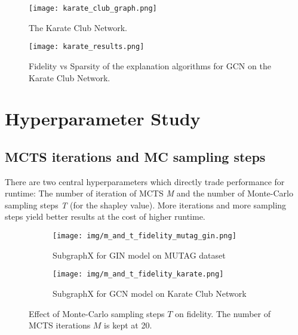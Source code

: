 \begin{figure}[htb]
\centering
\begin{minipage}{.5\textwidth}
    \centering
    \texttt{[image: karate\_club\_graph.png]}
    \caption{The Karate Club Network.}
    \label{fig:karate_graph}
\end{minipage}%
\begin{minipage}{.5\textwidth}
    \centering
    \texttt{[image: karate\_results.png]}
    \caption{Fidelity vs Sparsity of the explanation algorithms for GCN on the Karate Club Network.}
    \label{fig:karate_result}
\end{minipage}
\end{figure}



\section{Hyperparameter Study}
\subsection{MCTS iterations and MC sampling steps}
There are two central hyperparameters which directly trade performance for runtime: The number of iteration of MCTS \textit{M} and the number of Monte-Carlo sampling steps \textit{T} (for the shapley value). 
More iterations and more sampling steps yield better results at the cost of higher runtime.

\begin{figure}[htb]
  \begin{subfigure}{0.5\textwidth}
    \texttt{[image: img/m\_and\_t\_fidelity\_mutag\_gin.png]}
    \caption{SubgraphX for GIN model on MUTAG dataset} \label{fig:m_and_ta}
  \end{subfigure}%
  \hspace*{\fill}   %
  \begin{subfigure}{0.5\textwidth}
    \texttt{[image: img/m\_and\_t\_fidelity\_karate.png]}
    \caption{SubgraphX for GCN model on Karate Club Network} \label{fig:m_and_tb}
  \end{subfigure}%
\caption{Effect of Monte-Carlo sampling steps $T$ on fidelity. The number of MCTS iterations $M$ is kept at 20.} \label{fig:m_and_t}
\end{figure}


